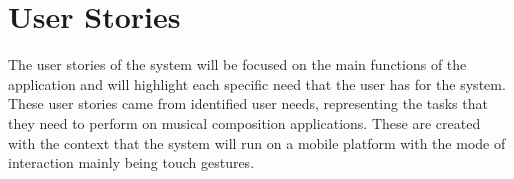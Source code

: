 \begin{comment}
\chapter{Resource Persons}
\label{sec:appendixf}

\newcommand{\resperson}[4]{\textbf{#1} \\ #2 \\ #3 \\ \url{#4}\vspace{0.5em}\\}

\resperson{Mr. Jordan Aiko Deja}{Adviser}{College of Computer Studies\\De La Salle University-Manila}{jordan.deja@dlsu.edu.ph}
\\
\resperson{Dr. Rafael Cabredo}{Chair, Software Technology Department}{College of Computer Studies\\De La Salle University-Manila}{rafael.cabredo@dlsu.edu.ph}

\end{comment}

\chapter{User Stories}
\label{sec:user_stories}

  The user stories of the system will be focused on the main functions of the application and will highlight each specific need that the user has for the system. These user stories came from identified user needs, representing the tasks that they need to perform on musical composition applications. These are created with the context that the system will run on a mobile platform with the mode of interaction mainly being touch gestures. 

